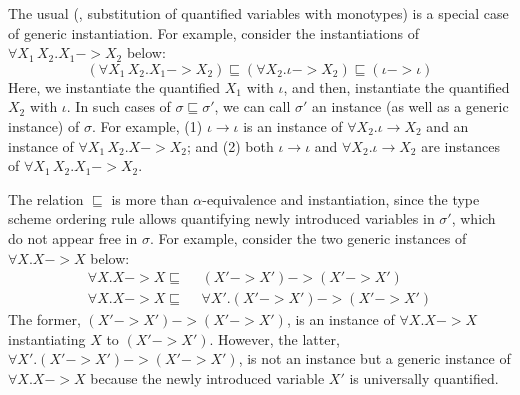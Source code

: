 The usual  (\ie, substitution of quantified variables
with monotypes) is a special case of generic instantiation. For example,
consider the instantiations of $\forall X_1\,X_2.X_1 -> X_2$ below:
\[ (\forall X_1\,X_2.X_1 -> X_2) \sqsubseteq
   (\forall X_2.\iota -> X_2) \sqsubseteq (\iota -> \iota)
\] 
Here, we instantiate the quantified $X_1$ with $\iota$,
and then, instantiate the quantified $X_2$ with $\iota$.
In such cases of $\sigma\sqsubseteq\sigma'$, we can call $\sigma'$ an instance
(as well as a generic instance) of $\sigma$. For example, (1) $\iota\to\iota$ is
an instance of $\forall X_2.\iota\to X_2$ and an instance of $\forall X_1\,X_2.X->X_2$; and (2)
both $\iota\to\iota$ and $\forall X_2.\iota\to X_2$ are instances of
$\forall X_1\,X_2.X_1->X_2$.

The relation $\sqsubseteq$
is more than $\alpha$-equivalence and instantiation, since
the type scheme ordering rule allows quantifying newly introduced
variables in $\sigma'$, which do not appear free in $\sigma$.
For example, consider the two generic instances of $\forall X.X -> X$ below:
\begin{align*}
\forall X.X -> X \sqsubseteq\;\,& (X'-> X')-> (X'-> X') \\
\forall X.X -> X \sqsubseteq\;\,& \forall X'.(X'-> X')-> (X'-> X')
\end{align*}
The former, $(X'-> X')-> (X'-> X')$, is an instance of $\forall X.X -> X$
instantiating $X$ to $(X'-> X')$. However, the latter,
$\forall X'.(X'-> X')-> (X'-> X')$, is not an instance
but a generic instance of $\forall X.X-> X$ because
the newly introduced variable $X'$ is universally quantified.

